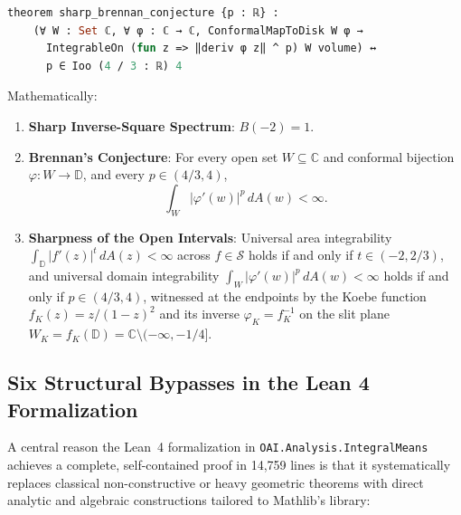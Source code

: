 \documentclass[11pt,reqno]{amsart}
\theoremstyle{definition}
\newcommand{\D}{\mathbb{D}}
\newcommand{\C}{\mathbb{C}}
\newcommand{\Sclass}{\mathcal{S}}
\begin{document}
\begin{itemize}
\begin{lstlisting}[language=Caml]
theorem sharp_brennan_conjecture {p : ℝ} :
    (∀ W : Set ℂ, ∀ φ : ℂ → ℂ, ConformalMapToDisk W φ →
      IntegrableOn (fun z => ‖deriv φ z‖ ^ p) W volume) ↔
      p ∈ Ioo (4 / 3 : ℝ) 4
\end{lstlisting}
Mathematically:
\begin{enumerate}[label=(\arabic*)]
\item \textbf{Sharp Inverse-Square Spectrum}: $B(-2) = 1$.
\item \textbf{Brennan's Conjecture}: For every open set $W \subseteq \C$ and conformal bijection $\varphi : W \to \D$, and every $p \in (4/3, 4)$,
\[
\int_W |\varphi'(w)|^p\,dA(w) < \infty.
\]
\item \textbf{Sharpness of the Open Intervals}: Universal area integrability $\int_{\D}|f'(z)|^t\,dA(z)<\infty$ across $f\in\Sclass$ holds if and only if $t \in (-2, 2/3)$, and universal domain integrability $\int_W |\varphi'(w)|^p\,dA(w) < \infty$ holds if and only if $p \in (4/3, 4)$, witnessed at the endpoints by the Koebe function $f_K(z) = z/(1-z)^2$ and its inverse $\varphi_K = f_K^{-1}$ on the slit plane $W_K = f_K(\D) = \C \setminus (-\infty, -1/4]$.
\end{enumerate}
\end{itemize}

\subsection{Six Structural Bypasses in the Lean 4 Formalization}

A central reason the Lean~4 formalization in \texttt{OAI.Analysis.IntegralMeans} achieves a complete, self-contained proof in 14,759 lines is that it systematically replaces classical non-constructive or heavy geometric theorems with direct analytic and algebraic constructions tailored to Mathlib's library:
\end{document}
